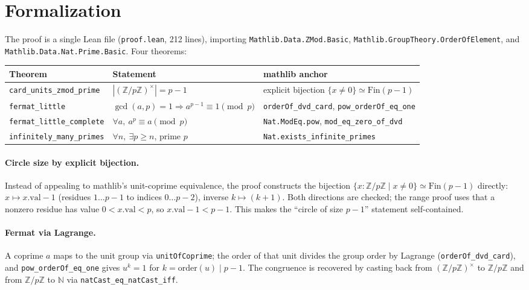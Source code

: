 \documentclass[sigplan,10pt,anonymous,review]{acmart}
\begin{document}
\section{Formalization}

The proof is a single Lean file (\texttt{proof.lean}, 212 lines), importing
\texttt{Mathlib.Data.ZMod.Basic}, \texttt{Mathlib.GroupTheory.OrderOfElement},
and \texttt{Mathlib.Data.Nat.Prime.Basic}. Four theorems:

\begin{center}
\begin{tabular}{lll}
\toprule
Theorem & Statement & mathlib anchor \\
\midrule
\texttt{card\_units\_zmod\_prime} & $|(\mathbb{Z}/p\mathbb{Z})^\times| = p-1$
  & explicit bijection $\{x\ne0\} \simeq \mathrm{Fin}(p-1)$ \\
\texttt{fermat\_little} & $\gcd(a,p)=1 \Rightarrow a^{p-1} \equiv 1 \pmod p$
  & \texttt{orderOf\_dvd\_card}, \texttt{pow\_orderOf\_eq\_one} \\
\texttt{fermat\_little\_complete} & $\forall a,\ a^p \equiv a \pmod p$
  & \texttt{Nat.ModEq.pow}, \texttt{mod\_eq\_zero\_of\_dvd} \\
\texttt{infinitely\_many\_primes} & $\forall n,\ \exists p \ge n$, prime $p$
  & \texttt{Nat.exists\_infinite\_primes} \\
\bottomrule
\end{tabular}
\end{center}

\paragraph{Circle size by explicit bijection.} Instead of appealing to
mathlib's unit-coprime equivalence, the proof constructs the bijection
$\{x : \mathbb{Z}/p\mathbb{Z} \mid x \ne 0\} \simeq \mathrm{Fin}(p-1)$
directly: $x \mapsto x.\mathrm{val} - 1$ (residues $1 \ldots p-1$ to
indices $0 \ldots p-2$), inverse $k \mapsto (k+1)$. Both directions are
checked; the range proof uses that a nonzero residue has value $0 <
x.\mathrm{val} < p$, so $x.\mathrm{val} - 1 < p - 1$. This makes the
``circle of size $p-1$'' statement self-contained.

\paragraph{Fermat via Lagrange.} A coprime $a$ maps to the unit group via
\texttt{unitOfCoprime}; the order of that unit divides the group order by
Lagrange (\texttt{orderOf\_dvd\_card}), and
\texttt{pow\_orderOf\_eq\_one} gives $u^{k} = 1$ for $k =
\mathrm{order}(u) \mid p-1$. The congruence is recovered by casting back
from $(\mathbb{Z}/p\mathbb{Z})^\times$ to $\mathbb{Z}/p\mathbb{Z}$ and
from $\mathbb{Z}/p\mathbb{Z}$ to $\mathbb{N}$ via
\texttt{natCast\_eq\_natCast\_iff}.
\end{document}
